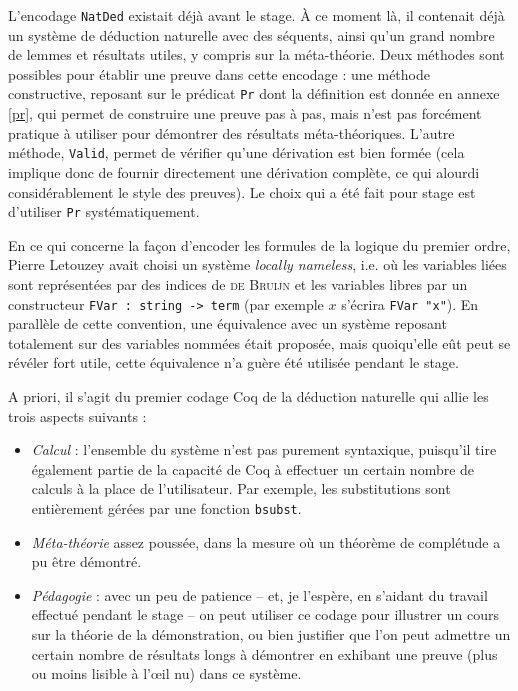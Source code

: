 \documentclass[a4paper]{article}
\theoremstyle{remark}
\theoremstyle{remark}
\theoremstyle{remark}
\theoremstyle{definition}
\theoremstyle{definition}
\theoremstyle{definition}
\begin{document}
L'encodage \verb+NatDed+ existait déjà avant le stage. \`A ce moment là, il contenait déjà un système de déduction naturelle avec des séquents, ainsi qu'un grand nombre de lemmes et résultats utiles, y compris sur la méta-théorie. Deux méthodes sont possibles pour établir une preuve dans cette encodage : une méthode constructive, reposant sur le prédicat \verb+Pr+ dont la définition est donnée en annexe \ref{pr}, qui permet de construire une preuve pas à pas, mais n'est pas forcément pratique à utiliser pour démontrer des résultats méta-théoriques. L'autre méthode, \verb+Valid+, permet de vérifier qu'une dérivation est bien formée (cela implique donc de fournir directement une dérivation complète, ce qui alourdi considérablement le style des preuves). Le choix qui a été fait pour stage est d'utiliser \verb+Pr+ systématiquement.

En ce qui concerne la façon d'encoder les formules de la logique du premier ordre, Pierre Letouzey avait choisi un système \emph{locally nameless}, i.e. où les variables liées sont représentées par des indices de \textsc{de Bruijn} et les variables libres par un constructeur \verb+FVar : string -> term+ (par exemple $x$ s'écrira \verb+FVar "x"+). En parallèle de cette convention, une équivalence avec un système reposant totalement sur des variables nommées était proposée, mais quoiqu'elle eût peut se révéler fort utile, cette équivalence n'a guère été utilisée pendant le stage.
\medskip

A priori, il s'agit du premier codage Coq de la déduction naturelle qui allie les trois aspects suivants :
\begin{itemize}
\item \emph{Calcul} : l'ensemble du système n'est pas purement syntaxique, puisqu'il tire également partie de la capacité de Coq à effectuer un certain nombre de calculs à la place de l'utilisateur. Par exemple, les substitutions sont entièrement gérées par une fonction \verb+bsubst+.
\item \emph{Méta-théorie} assez poussée, dans la mesure où un théorème de complétude a pu être démontré.
\item \emph{Pédagogie} : avec un peu de patience -- et, je l'espère, en s'aidant du travail effectué pendant le stage -- on peut utiliser ce codage pour illustrer un cours sur la théorie de la démonstration, ou bien justifier que l'on peut admettre un certain nombre de résultats longs à démontrer en exhibant une preuve (plus ou moins lisible à l'\oe il nu) dans ce système.
\end{itemize}
\end{document}
